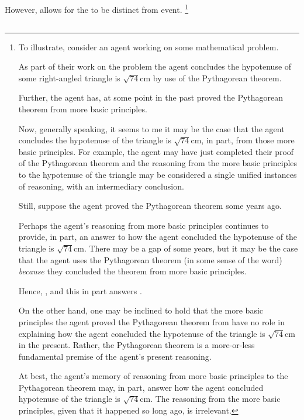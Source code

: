 \begin{note}
  However, allows for the \witness{} to be distinct from event.%
  \footnote{
    To illustrate, consider an agent working on some mathematical problem.

    As part of their work on the problem the agent concludes the hypotenuse of some right-angled triangle is \(\sqrt{74}\text{cm}\) by use of the Pythagorean theorem.

    Further, the agent has, at some point in the past proved the Pythagorean theorem from more basic principles.

    Now, generally speaking, it seems to me it may be the case that the agent concludes the hypotenuse of the triangle is \(\sqrt{74}\text{cm}\), in part, from those more basic principles.
    For example, the agent may have just completed their proof of the Pythagorean theorem and the reasoning from the more basic principles to the hypotenuse of the triangle may be considered a single unified instances of reasoning, with an intermediary conclusion.

    Still, suppose the agent proved the Pythagorean theorem some years ago.

    Perhaps the agent's reasoning from more basic principles continues to provide, in part, an answer to how the agent concluded the hypotenuse of the triangle is \(\sqrt{74}\text{cm}\).
    There may be a gap of some years, but it may be the case that the agent uses the Pythagorean theorem (in some sense of the word) \emph{because} they concluded the theorem from more basic principles.

    {
      \color{red}
      Hence, \support{}, and this in part answers \qWhyVnP{}.
    }

    On the other hand, one may be inclined to hold that the more basic principles the agent proved the Pythagorean theorem from have no role in explaining how the agent concluded the hypotenuse of the triangle is \(\sqrt{74}\text{cm}\) in the present.
    Rather, the Pythagorean theorem is a more-or-less fundamental premise of the agent's present reasoning.

    At best, the agent's memory of reasoning from more basic principles to the Pythagorean theorem may, in part, answer how the agent concluded hypotenuse of the triangle is \(\sqrt{74}\text{cm}\).
    The reasoning from the more basic principles, given that it happened so long ago, is irrelevant.
  }
\end{note}

\subsection{\issueConstraint{}}
\label{sec:variants-initial:issue}

